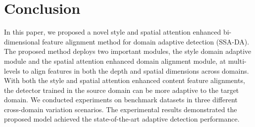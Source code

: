 \documentclass[runningheads]{llncs}
\begin{document}
\section{Conclusion}

In this paper, we proposed a novel style and spatial attention enhanced bi-dimensional feature alignment method for domain adaptive detection (SSA-DA).
The proposed method deploys two important modules, the style domain adaptive module and the spatial attention enhanced domain alignment module, at multi-levels to align features in both the depth and spatial dimensions across domains. 
With both the style and spatial attention enhanced content feature alignments, the detector trained in the source domain
can be more adaptive to the target domain.
We conducted experiments on benchmark datasets in three different cross-domain variation scenarios.
The experimental results demonstrated the proposed model achieved the state-of-the-art adaptive detection performance. 





\end{document}
